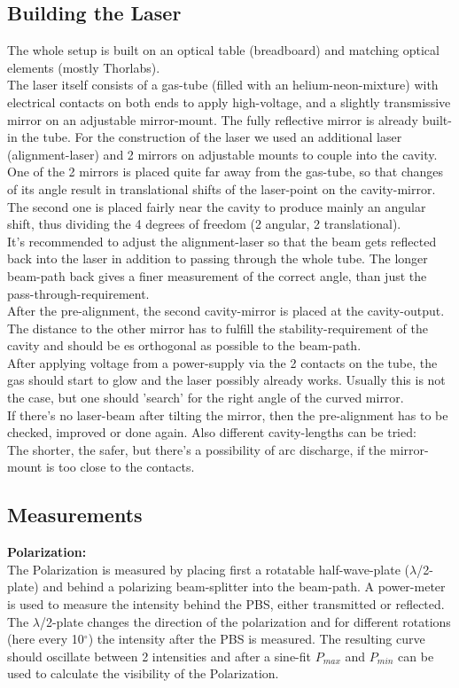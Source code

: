 \documentclass[12pt,a4paper]{article}
\begin{document}
\begin{multicols}{2}
\subsection{Building the Laser}
The whole setup is built on an optical table (breadboard) and matching optical elements (mostly Thorlabs).\\
The laser itself consists of a gas-tube (filled with an helium-neon-mixture) with electrical contacts on both ends to apply high-voltage, and a slightly transmissive mirror on an adjustable mirror-mount. The fully reflective mirror is already built-in the tube.
For the construction of the laser we used an additional laser (alignment-laser) and 2 mirrors on adjustable mounts to couple into the cavity.\\
One of the 2 mirrors is placed quite far away from the gas-tube, so that changes of its angle result in translational shifts of the laser-point on the cavity-mirror. The second one is placed fairly near the cavity to produce mainly an angular shift, thus dividing the 4 degrees of freedom (2 angular, 2 translational).\\
It's recommended to adjust the alignment-laser so that the beam gets reflected back into the laser in addition to passing through the whole tube. The longer beam-path back gives a finer measurement of the correct angle, than just the pass-through-requirement.\\

\noindent After the pre-alignment, the second cavity-mirror is placed at the cavity-output. The distance to the other mirror has to fulfill the stability-requirement of the cavity and should be es orthogonal as possible to the beam-path.\\
After applying voltage from a power-supply via the 2 contacts on the tube, the gas should start to glow and the laser possibly already works. Usually this is not the case, but one should 'search' for the right angle of the curved mirror.\\
If there's no laser-beam after tilting the mirror, then the pre-alignment has to be checked, improved or done again. Also different cavity-lengths can be tried:\\
The shorter, the safer, but there's a possibility of arc discharge, if the mirror-mount is too close to the contacts.

\subsection{Measurements}
\textbf{Polarization:}\\
The Polarization is measured by placing first a rotatable half-wave-plate ($\lambda$/2-plate) and behind a polarizing beam-splitter into the beam-path. A power-meter is used to measure the intensity behind the PBS, either transmitted or reflected. The $\lambda$/2-plate changes the direction of the polarization and for different rotations (here every 10$^\circ$) the intensity after the PBS is measured. The resulting curve should oscillate between 2 intensities and after a sine-fit $P_{max}$ and $P_{min}$ can be used to calculate the visibility of the Polarization.\\


\end{multicols}
\end{document}
